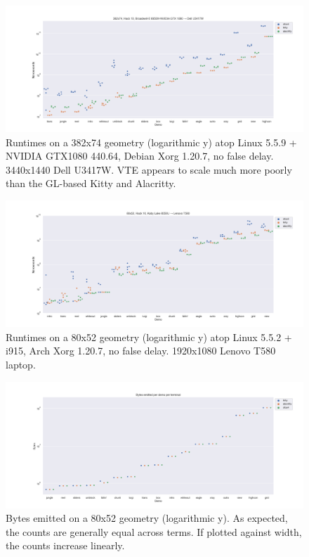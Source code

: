 \begin{figure}[!htb]
\centering
\includegraphics[width=1\textwidth]{media/d0-large-nvidia.png}
\caption[382x74 NVIDIA GTX 1080 benchmarks.]{Runtimes on a 382x74 geometry (logarithmic y) atop Linux 5.5.9 + NVIDIA GTX1080 440.64, Debian Xorg 1.20.7, no false delay. 3440x1440 Dell U3417W. VTE appears to scale much more poorly than the GL-based Kitty and Alacritty.}
\label{fig:nvidia-full}
\end{figure}

\begin{figure}[!htb]
\centering
\includegraphics[width=1\textwidth]{media/i915-80x52.png}
\caption[80x52 Intel i7-8550U benchmarks.]{Runtimes on a 80x52 geometry (logarithmic y) atop Linux 5.5.2 + i915, Arch Xorg 1.20.7, no false delay. 1920x1080 Lenovo T580 laptop.}
\label{fig:intel-full}
\end{figure}

\begin{figure}[!htb]
\centering
\includegraphics[width=1\textwidth]{media/plotbytes.png}
\caption[Bytes output per demo per term.]{Bytes emitted on a 80x52 geometry (logarithmic y). As expected, the counts are generally equal across terms. If plotted against width, the counts increase linearly.}
\label{fig:nvidia-full}
\end{figure}

